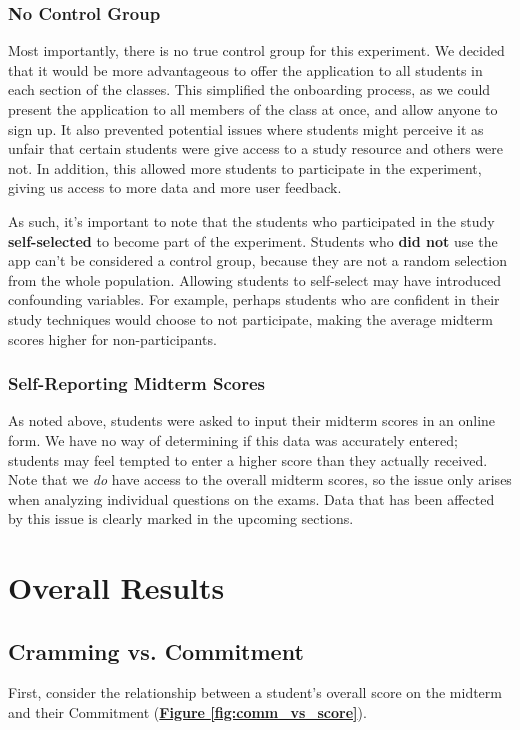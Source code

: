 \subsubsection{No Control Group} 
\par Most importantly, there is no true control group for this experiment. We decided that it would be more advantageous to offer the application to all students in each section of the classes. This simplified the onboarding process, as we could present the application to all members of the class at once, and allow anyone to sign up. It also prevented potential issues where students might perceive it as unfair that certain students were give access to a study resource and others were not. In addition, this allowed more students to participate in the experiment, giving us access to more data and more user feedback.

\par As such, it's important to note that the students who participated in the study \textbf{self-selected} to become part of the experiment. Students who \textbf{did not} use the app can't be considered a control group, because they are not a random selection from the whole population. Allowing students to self-select may have introduced confounding variables. For example, perhaps students who are confident in their study techniques would choose to not participate, making the average midterm scores higher for non-participants.

\subsubsection{Self-Reporting Midterm Scores}
\par As noted above, students were asked to input their midterm scores in an online form. We have no way of determining if this data was accurately entered; students may feel tempted to enter a higher score than they actually received. Note that we \textit{do} have access to the overall midterm scores, so the issue only arises when analyzing individual questions on the exams. Data that has been affected by this issue is clearly marked in the upcoming sections.

\section{Overall Results}
\subsection{Cramming vs. Commitment}
\par First, consider the relationship between a student's overall score on the midterm and their Commitment (\textbf{\hyperref[fig:comm_vs_score]{Figure \ref*{fig:comm_vs_score}}}). 
 
